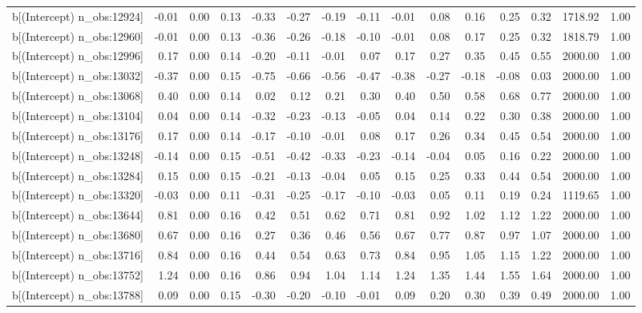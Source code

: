 \begin{table}[ht]
\begin{tabular}{rrrrrrrrrrrrrrr}
  b[(Intercept) n\_obs:12924] & -0.01 & 0.00 & 0.13 & -0.33 & -0.27 & -0.19 & -0.11 & -0.01 & 0.08 & 0.16 & 0.25 & 0.32 & 1718.92 & 1.00 \\ 
  b[(Intercept) n\_obs:12960] & -0.01 & 0.00 & 0.13 & -0.36 & -0.26 & -0.18 & -0.10 & -0.01 & 0.08 & 0.17 & 0.25 & 0.32 & 1818.79 & 1.00 \\ 
  b[(Intercept) n\_obs:12996] & 0.17 & 0.00 & 0.14 & -0.20 & -0.11 & -0.01 & 0.07 & 0.17 & 0.27 & 0.35 & 0.45 & 0.55 & 2000.00 & 1.00 \\ 
  b[(Intercept) n\_obs:13032] & -0.37 & 0.00 & 0.15 & -0.75 & -0.66 & -0.56 & -0.47 & -0.38 & -0.27 & -0.18 & -0.08 & 0.03 & 2000.00 & 1.00 \\ 
  b[(Intercept) n\_obs:13068] & 0.40 & 0.00 & 0.14 & 0.02 & 0.12 & 0.21 & 0.30 & 0.40 & 0.50 & 0.58 & 0.68 & 0.77 & 2000.00 & 1.00 \\ 
  b[(Intercept) n\_obs:13104] & 0.04 & 0.00 & 0.14 & -0.32 & -0.23 & -0.13 & -0.05 & 0.04 & 0.14 & 0.22 & 0.30 & 0.38 & 2000.00 & 1.00 \\ 
  b[(Intercept) n\_obs:13176] & 0.17 & 0.00 & 0.14 & -0.17 & -0.10 & -0.01 & 0.08 & 0.17 & 0.26 & 0.34 & 0.45 & 0.54 & 2000.00 & 1.00 \\ 
  b[(Intercept) n\_obs:13248] & -0.14 & 0.00 & 0.15 & -0.51 & -0.42 & -0.33 & -0.23 & -0.14 & -0.04 & 0.05 & 0.16 & 0.22 & 2000.00 & 1.00 \\ 
  b[(Intercept) n\_obs:13284] & 0.15 & 0.00 & 0.15 & -0.21 & -0.13 & -0.04 & 0.05 & 0.15 & 0.25 & 0.33 & 0.44 & 0.54 & 2000.00 & 1.00 \\ 
  b[(Intercept) n\_obs:13320] & -0.03 & 0.00 & 0.11 & -0.31 & -0.25 & -0.17 & -0.10 & -0.03 & 0.05 & 0.11 & 0.19 & 0.24 & 1119.65 & 1.00 \\ 
  b[(Intercept) n\_obs:13644] & 0.81 & 0.00 & 0.16 & 0.42 & 0.51 & 0.62 & 0.71 & 0.81 & 0.92 & 1.02 & 1.12 & 1.22 & 2000.00 & 1.00 \\ 
  b[(Intercept) n\_obs:13680] & 0.67 & 0.00 & 0.16 & 0.27 & 0.36 & 0.46 & 0.56 & 0.67 & 0.77 & 0.87 & 0.97 & 1.07 & 2000.00 & 1.00 \\ 
  b[(Intercept) n\_obs:13716] & 0.84 & 0.00 & 0.16 & 0.44 & 0.54 & 0.63 & 0.73 & 0.84 & 0.95 & 1.05 & 1.15 & 1.22 & 2000.00 & 1.00 \\ 
  b[(Intercept) n\_obs:13752] & 1.24 & 0.00 & 0.16 & 0.86 & 0.94 & 1.04 & 1.14 & 1.24 & 1.35 & 1.44 & 1.55 & 1.64 & 2000.00 & 1.00 \\ 
  b[(Intercept) n\_obs:13788] & 0.09 & 0.00 & 0.15 & -0.30 & -0.20 & -0.10 & -0.01 & 0.09 & 0.20 & 0.30 & 0.39 & 0.49 & 2000.00 & 1.00 \\ 

\end{tabular}
\end{table}

